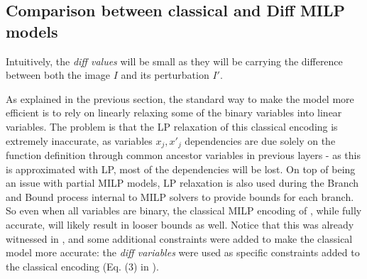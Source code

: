 	
	



	\iffalse

\subsection{Comparison between classical and Diff MILP models}


Intuitively, the {\em diff values} will be small as they will be carrying the difference between both the image $I$ and its perturbation $I'$.
    

	As explained in the previous section, the standard way to make the model more efficient is to rely on linearly relaxing some of the binary variables into linear variables.
    The problem is that the LP relaxation of this classical encoding is extremely inaccurate, as variables $x_j,x'_j$ dependencies are due solely on the function definition through common ancestor variables in previous layers - as this is approximated with LP, most of the dependencies will be lost. On top of being an issue with partial MILP models, LP relaxation is also used during the Branch and Bound process internal to MILP solvers to provide bounds for each branch. So even when all variables are binary, the classical MILP encoding 
	of \cite{MILP}, while fully accurate, will likely result in looser bounds as well. Notice that this was already witnessed in \cite{ITNE}, and some additional constraints were added to make the classical model more accurate: the {\em diff variables} were used as specific constraints added to the classical encoding (Eq. (3) in \cite{ITNE}). 


